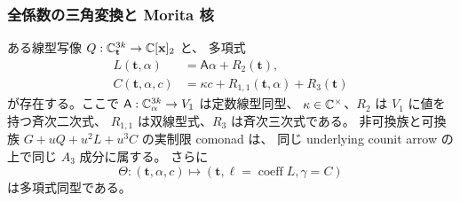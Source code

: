 \subsubsection{全係数の三角変換と Morita 核}

\begin{proposition}[定数可逆行列による三角多項式変換]
\label{euk:prop:coefficients}
ある線型写像 $Q:\mathbb C^{3k}_{\mathbf t}\to\mathbb C[\mathbf x]_2$ と、
多項式
\begin{equation}\label{euk:eq:coefficients}
 \begin{split}
 L(\mathbf t,\alpha)&=\mathsf A\alpha+R_2(\mathbf t),\\
 C(\mathbf t,\alpha,c)&=\kappa c+R_{1,1}(\mathbf t,\alpha)+R_3(\mathbf t)
 \end{split}
\end{equation}
が存在する。ここで $\mathsf A:\mathbb C^{3k}_\alpha\to V_1$ は定数線型同型、
$\kappa\in\mathbb C^\times$、$R_2$ は $V_1$ に値を持つ斉次二次式、
$R_{1,1}$ は双線型式、$R_3$ は斉次三次式である。
非可換族と可換族 $G+uQ+u^2L+u^3C$ の実制限 comonad は、
同じ underlying counit arrow の上で同じ $A_3$ 成分に属する。
さらに
\[
 \Theta:(\mathbf t,\alpha,c)\longmapsto
     (\mathbf t,\ell=\operatorname{coeff}L,\gamma=C)
\]
は多項式同型である。
\end{proposition}

